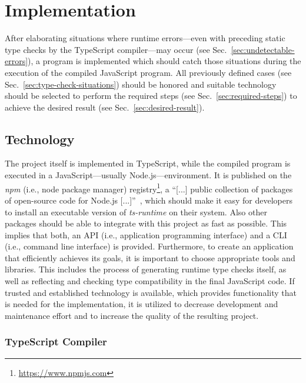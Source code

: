 \chapter{Implementation}
\label{cha:implementation}

After elaborating situations where runtime errors---even with preceding static type checks by the TypeScript compiler---may occur (see Sec.~\ref{sec:undetectable-errors}), a program is implemented which should catch those situations during the execution of the compiled JavaScript program. All previously defined cases (see Sec.~\ref{sec:type-check-situations}) should be honored and suitable technology should be selected to perform the required steps (see Sec.~\ref{sec:required-steps}) to achieve the desired result (see Sec.~\ref{sec:desired-result}).

\section{Technology}
\label{sec:technology}

The project itself is implemented in TypeScript, while the compiled program is executed in a JavaScript---usually Node.js---environment. It is published on the \emph{npm} (i.e., node package manager) registry\footnote{\url{https://www.npmjs.com}}, a ``[...] public collection of packages of open-source code for Node.js [...]''~\cite{npmjs:about}, which should make it easy for developers to install an executable version of \emph{ts-runtime} on their system. Also other packages should be able to integrate  with this project as fast as possible. This implies that both, an API (i.e., application programming interface) and a CLI (i.e., command line interface) is provided. Furthermore, to create an application that efficiently achieves its goals, it is important to choose appropriate tools and libraries. This includes the process of generating runtime type checks itself, as well as reflecting and checking type compatibility in the final JavaScript code. If trusted and established technology is available, which provides functionality that is needed for the implementation, it is utilized to decrease development and maintenance effort and to increase the quality of the resulting project.

\subsection{TypeScript Compiler}
\label{sec:typescript-compiler}

